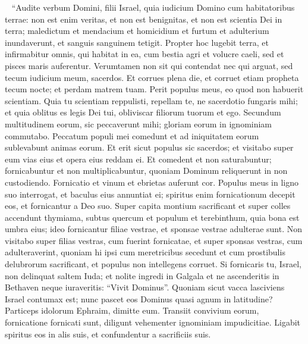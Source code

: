 \begin{biblechapter}   
\verse “Audite verbum Domini, filii Israel, quia iudicium Domino cum habitatoribus terrae: non est enim veritas, et non est benignitas, et non est scientia Dei in terra; 
\verse maledictum et mendacium et homicidium et furtum et adulterium inundaverunt, et sanguis sanguinem tetigit. 
\verse Propter hoc lugebit terra, et infirmabitur omnis, qui habitat in ea, cum bestia agri et volucre caeli, sed et pisces maris auferentur. 
\verse Verumtamen non sit qui contendat nec qui arguat, sed tecum iudicium meum, sacerdos. 
\verse Et corrues plena die, et corruet etiam propheta tecum nocte; et perdam matrem tuam. 
\verse Perit populus meus, eo quod non habuerit scientiam. Quia tu scientiam reppulisti, repellam te, ne sacerdotio fungaris mihi; et quia oblitus es legis Dei tui, obliviscar filiorum tuorum et ego. 
\verse Secundum multitudinem eorum, sic peccaverunt mihi; gloriam eorum in ignominiam commutabo. 
\verse Peccatum populi mei comedunt et ad iniquitatem eorum sublevabunt animas eorum. 
\verse Et erit sicut populus sic sacerdos; et visitabo super eum vias eius et opera eius reddam ei. 
\verse Et comedent et non saturabuntur; fornicabuntur et non multiplicabuntur, quoniam Dominum reliquerunt in non custodiendo. 
\verse Fornicatio et vinum et ebrietas auferunt cor. 
\verse Populus meus in ligno suo interrogat, et baculus eius annuntiat ei; spiritus enim fornicationum decepit eos, et fornicantur a Deo suo. 
\verse Super capita montium sacrificant et super colles accendunt thymiama, subtus quercum et populum et terebinthum, quia bona est umbra eius; ideo fornicantur filiae vestrae, et sponsae vestrae adulterae sunt. 
\verse Non visitabo super filias vestras, cum fuerint fornicatae, et super sponsas vestras, cum adulteraverint, quoniam hi ipsi cum meretricibus secedunt et cum prostibulis delubrorum sacrificant, et populus non intellegens corruet. 
\verse Si fornicaris tu, Israel, non delinquat saltem Iuda; et nolite ingredi in Galgala et ne ascenderitis in Bethaven neque iuraveritis: “Vivit Dominus”. 
\verse Quoniam sicut vacca lasciviens Israel contumax est; nunc pascet eos Dominus quasi agnum in latitudine? 
\verse Particeps idolorum Ephraim, dimitte eum. 
\verse Transiit convivium eorum, fornicatione fornicati sunt, diligunt vehementer ignominiam impudicitiae. 
\verse Ligabit spiritus eos in alis suis, et confundentur a sacrificiis suis. 
\end{biblechapter}

